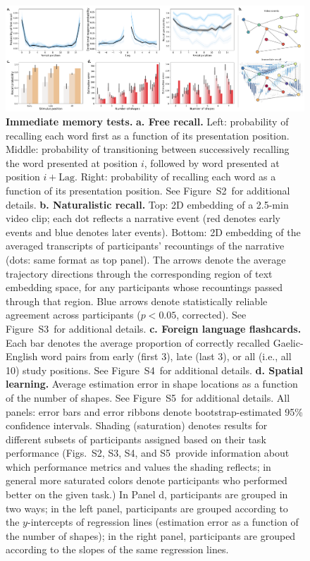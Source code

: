 \documentclass[10pt]{article}
\newcommand{\frDetail}{S2}
\newcommand{\natDetail}{S3}
\newcommand{\vocabDetail}{S4}
\newcommand{\spatialDetail}{S5}
\begin{document}
\begin{figure}[tp]
\centering
\includegraphics[width=1\textwidth]{figs/behavior_overview_immediate}
\caption{\textbf{Immediate memory tests.}  \textbf{a. Free recall.}
  Left: probability of recalling each word first as a function of its
  presentation position.  Middle: probability of transitioning between
successively recalling the word presented at position $i$, followed by
word presented at position $i + \mathrm{Lag}$.  Right: probability of
recalling each word as a function of its presentation position.  See
Figure~\frDetail~for additional details.
\textbf{b. Naturalistic recall.}  Top: 2D embedding of a 2.5-min video
clip; each dot reflects a narrative event (red denotes early events
and blue denotes later events).  Bottom: 2D embedding of the averaged
transcripts of participants' recountings of the narrative (dots: same
format as top panel).  The arrows denote the average trajectory
directions through the corresponding region of text embedding space,
for any participants whose recountings passed through that region.
Blue arrows denote statistically reliable agreement across
participants ($p < 0.05$, corrected).  See Figure~\natDetail~for
additional details.  \textbf{c. Foreign language
  flashcards.} Each bar denotes the average proportion of correctly
recalled Gaelic-English word pairs from early (first 3), late (last
3), or all (i.e., all 10) study positions.  See
Figure~\vocabDetail~for additional details.  \textbf{d. Spatial
  learning.}  Average estimation error in shape locations as a
function of the number of shapes.  See Figure~\spatialDetail~for
additional details.  All panels: error bars and error
ribbons denote bootstrap-estimated 95\% confidence intervals.  Shading
(saturation) denotes results for different subsets of participants
assigned based on their task performance (Figs.~\frDetail,
\natDetail, \vocabDetail, and \spatialDetail~provide information about
which performance metrics and values the shading reflects; in general
more saturated colors denote participants who performed better on the
given task.)  In Panel d, participants are grouped in two ways; in the
left panel, participants are grouped according to the $y$-intercepts of regression lines (estimation error as a
function of the number of shapes); in the right panel, participants
are grouped according to the slopes of the same regression lines.}
\label{fig:immediate_behavior}
\end{figure}
\end{document}
